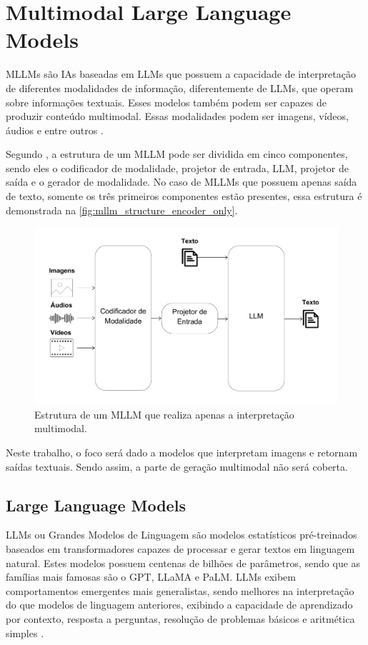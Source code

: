 \section{Multimodal Large Language Models}

\acp{MLLM} são \acp{IA} baseadas em \acp{LLM} que possuem a capacidade de interpretação de diferentes modalidades de informação, diferentemente de \acp{LLM}, que
operam sobre informações textuais. Esses modelos também podem ser capazes de produzir conteúdo multimodal. Essas modalidades podem ser imagens, vídeos, áudios e
entre outros \cite{mllm_survey_2023, mllm_survey_2024}.

Segundo \textcite{mllm_survey_2024}, a estrutura de um \ac{MLLM} pode ser dividida em cinco componentes, sendo eles o codificador de modalidade, projetor de entrada,
\ac{LLM}, projetor de saída e o gerador de modalidade. No caso de \acp{MLLM} que possuem apenas saída de texto, somente os três primeiros componentes estão presentes,
essa estrutura é demonstrada na \autoref{fig:mllm_structure_encoder_only}.

\begin{figure}[ht]
      \centering
      \includegraphics[width=0.7\columnwidth,keepaspectratio]{images/mllm_structure_encoder_only.pdf}
      \caption{\small Estrutura de um \ac{MLLM} que realiza apenas a interpretação multimodal.}
      \label{fig:mllm_structure_encoder_only}
\end{figure}

Neste trabalho, o foco será dado a modelos que interpretam imagens e retornam saídas textuais. Sendo assim, a parte de geração multimodal não será coberta.

\subsection{Large Language Models}

\acp{LLM} ou Grandes Modelos de Linguagem são modelos estatísticos pré-treinados baseados em transformadores capazes de processar e gerar textos em linguagem natural.
Estes modelos possuem centenas de bilhões de parâmetros, sendo que as famílias mais famosas são o \ac{GPT}, \ac{LLaMA} e \ac{PaLM}. \acp{LLM} exibem comportamentos
emergentes mais generalistas, sendo melhores na interpretação do que modelos de linguagem anteriores, exibindo a capacidade de aprendizado por contexto, resposta a
perguntas, resolução de problemas básicos e aritmética simples \cite{llm_survey_2024}.

